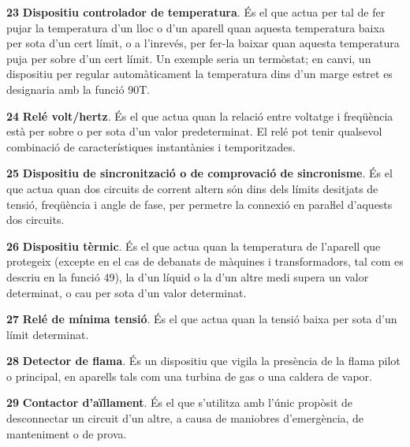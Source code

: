 \begin{multicols}{2}
\begin{list}{}
\item[\textbf{23}]   
\textbf{Dispositiu controlador de temperatura}. És el que actua per tal de fer pujar la
temperatura d'un lloc o d'un aparell quan aquesta temperatura baixa
per sota d'un cert límit, o a l'inrevés, per fer-la baixar quan aquesta
temperatura  puja per sobre d'un cert límit. Un exemple seria un
termòstat; en canvi, un dispositiu per regular automàticament la temperatura dins
d'un marge estret es designaria amb la funció 90T.

\item[\textbf{24}]  
 \textbf{Relé volt/hertz}.
És el que actua quan la relació  entre voltatge i freqüència està per sobre o  per sota d'un valor predeterminat. El relé pot tenir qualsevol combinació de característiques instantànies i temporitzades.

\item[\textbf{25}]   
\textbf{Dispositiu de sincronització o de comprovació
de sincronisme}. És el que actua quan dos circuits de corrent altern
són dins dels límits desitjats de tensió, freqüència i angle de
fase, per permetre la connexió en paraŀlel d'aquests dos circuits.


\item[\textbf{26}]    
\textbf{Dispositiu tèrmic}. És el que
actua quan la temperatura de l'aparell que protegeix (excepte en el cas de debanats de màquines i transformadors, tal com es descriu en la funció 49), la d'un líquid o la d'un altre medi  supera un valor
determinat, o cau per sota d'un valor determinat.


\item[\textbf{27}]   
\textbf{Relé de mínima tensió}. És el que
actua quan la tensió baixa per sota d'un límit determinat.

\item[\textbf{28}]   
\textbf{Detector de flama}. És un dispositiu que vigila la presència de la flama pilot o principal, en aparells tals com una turbina de gas o una caldera  de vapor.

\item[\textbf{29}]  
\textbf{Contactor d'aïllament}. És el que
s'utilitza amb l'únic propòsit de desconnectar un circuit d'un
altre,  a  causa de maniobres    d'emergència,  de manteniment o de
prova.


\end{list}
\end{multicols}
